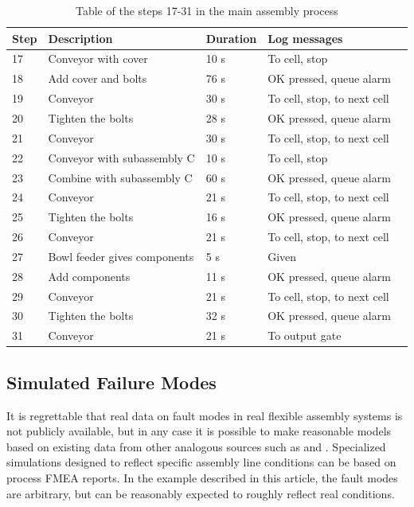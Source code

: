 \documentclass[journal]{IEEEtran}
\begin{document}
\begin{table}[!t]
\renewcommand{\arraystretch}{1.3}
\caption{Table of the steps 17-31 in the main assembly process}
\label{mainsteps2}
\centering
\begin{tabular}{|p{5mm}|p{20mm}|p{10mm}|p{15mm}|p{15mm}|}
\hline
Step & Description & Duration & Log messages \\
\hline
\hline
17 & Conveyor with cover & 10 s & To cell, stop \\
\hline
18 & Add cover and bolts & 76 s & OK pressed, queue alarm \\
\hline
19 & Conveyor & 30 s & To cell, stop, to next cell \\
\hline
20 & Tighten the bolts & 28 s & OK pressed, queue alarm \\
\hline
21 & Conveyor & 30 s & To cell, stop, to next cell \\
\hline
22 & Conveyor with subassembly C & 10 s & To cell, stop \\
\hline
23 & Combine with subassembly C & 60 s & OK pressed, queue alarm \\
\hline
24 & Conveyor & 21 s & To cell, stop, to next cell \\
\hline
25 & Tighten the bolts & 16 s & OK pressed, queue alarm \\
\hline
26 & Conveyor & 21 s & To cell, stop, to next cell \\
\hline
27 & Bowl feeder gives components & 5 s & Given \\
\hline
28 & Add components & 11 s & OK pressed, queue alarm \\
\hline
29 & Conveyor & 21 s & To cell, stop, to next cell \\
\hline
30 & Tighten the bolts & 32 s & OK pressed, queue alarm \\
\hline
31 & Conveyor & 21 s & To output gate \\
\hline
\end{tabular}
\end{table}

\subsection{Simulated Failure Modes}
It is regrettable that real data on fault modes in real flexible assembly systems is not publicly available, but in any case it is possible to make reasonable
models based on existing data from other analogous sources such as \cite{nasaames} and \cite{tsarouhas2009classification}. Specialized simulations designed
to reflect specific assembly line conditions can be based on process FMEA reports. In the example described in this article, the fault modes are arbitrary, but 
can be reasonably expected to roughly reflect real conditions.
\end{document}
